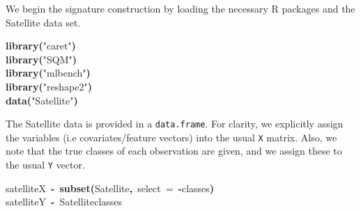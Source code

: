 \documentclass{article}
\makeatletter
\newcommand{\hlfunctioncall}[1]{\textcolor[rgb]{.5,0,.33}{\textbf{#1}}}%
\newcommand{\hlstring}[1]{\textcolor[rgb]{.6,.6,1}{#1}}%
\newcommand{\hlkeyword}[1]{\textbf{#1}}%
\newcommand{\hlargument}[1]{\textcolor[rgb]{.69,.25,.02}{#1}}%
\newcommand{\hlassignement}[1]{\textbf{#1}}%
\newcommand{\hlsymbol}[1]{#1}%
\newcommand{\hlstd}[1]{\textcolor[rgb]{0,0,0}{#1}}%
\newenvironment{kframe}{%
 \def\FrameCommand##1{\hskip\@totalleftmargin \hskip-\fboxsep
 \colorbox{shadecolor}{##1}\hskip-\fboxsep
     \hskip-\linewidth \hskip-\@totalleftmargin \hskip\columnwidth}%
 \MakeFramed {\advance\hsize-\width
   \@totalleftmargin\z@ \linewidth\hsize
   \@setminipage}}%
 {\par\unskip\endMakeFramed}
\newenvironment{knitrout}{}{} %
\makeatother
\begin{document}
We begin the signature construction by loading the necessary R packages and the
Satellite data set.

\begin{knitrout}
\color{fgcolor}\begin{kframe}
\begin{flushleft}
\ttfamily\noindent
\hlfunctioncall{library}\hlkeyword{(}\hlstring{"{}caret"{}}\hlkeyword{)}\hspace*{\fill}\\
\hlstd{}\hlfunctioncall{library}\hlkeyword{(}\hlstring{"{}SQM"{}}\hlkeyword{)}\hspace*{\fill}\\
\hlstd{}\hlfunctioncall{library}\hlkeyword{(}\hlstring{"{}mlbench"{}}\hlkeyword{)}\hspace*{\fill}\\
\hlstd{}\hlfunctioncall{library}\hlkeyword{(}\hlstring{"{}reshape2"{}}\hlkeyword{)}\hspace*{\fill}\\
\hlstd{}\hlfunctioncall{data}\hlkeyword{(}\hlstring{"{}Satellite"{}}\hlkeyword{)}\mbox{}
\normalfont
\end{flushleft}
\end{kframe}
\end{knitrout}


The Satellite data is provided in a {\tt data.frame}. For clarity, we explicitly
assign the variables (i.e covariates/feature vectors) into the usual {\tt X}
matrix. Also, we note that the true classes of each observation are given, and we
assign these to the usual {\tt Y} vector.

\begin{knitrout}
\color{fgcolor}\begin{kframe}
\begin{flushleft}
\ttfamily\noindent
\hlsymbol{satelliteX}{\ }\hlassignement{\usebox{\hlnormalsizeboxlessthan}-}{\ }\hlfunctioncall{subset}\hlkeyword{(}\hlsymbol{Satellite}\hlkeyword{,}{\ }\hlargument{select}{\ }\hlargument{=}{\ }\hlkeyword{-}\hlsymbol{classes}\hlkeyword{)}\hspace*{\fill}\\
\hlstd{}\hlsymbol{satelliteY}{\ }\hlassignement{\usebox{\hlnormalsizeboxlessthan}-}{\ }\hlsymbol{Satellite}\hlkeyword{\usebox{\hlnormalsizeboxdollar}}\hlsymbol{classes}\mbox{}
\normalfont
\end{flushleft}
\end{kframe}
\end{knitrout}
\end{document}
